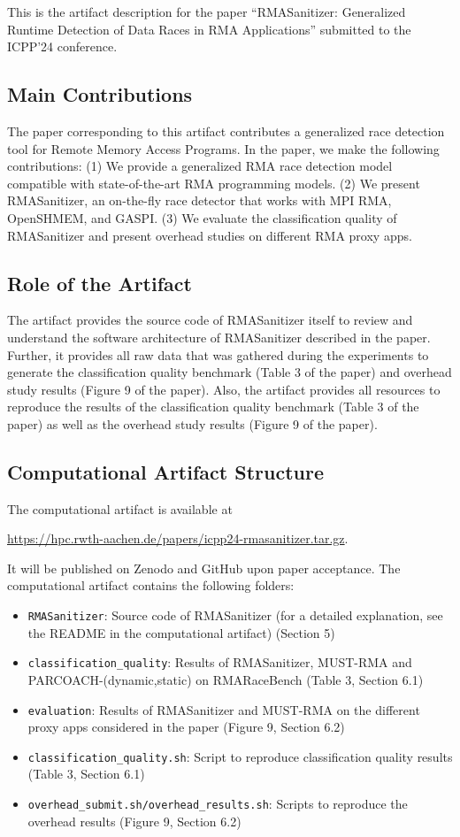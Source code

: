 \documentclass[twoside]{article}
\begin{document}
This is the artifact description for the paper ``RMASanitizer: Generalized Runtime Detection of Data Races in RMA Applications'' submitted to the ICPP'24 conference.

\subsection*{Main Contributions}
The paper corresponding to this artifact contributes a generalized race detection tool for Remote Memory Access Programs. In the paper, we make the following contributions: (1) We provide a generalized RMA race detection model compatible with state-of-the-art RMA programming models. (2) We present RMASanitizer, an on-the-fly race detector that works with MPI RMA, OpenSHMEM, and GASPI. (3) We evaluate the classification quality of RMASanitizer and present overhead studies on different RMA proxy apps.

\subsection*{Role of the Artifact}
The artifact provides the source code of RMASanitizer itself to review and understand the software architecture of RMASanitizer described in the paper. Further, it provides all raw data that was gathered during the experiments to generate the classification quality benchmark (Table 3 of the paper) and overhead study results (Figure 9 of the paper). Also, the artifact provides all resources to reproduce the results of the classification quality benchmark (Table 3 of the paper) as well as the overhead study results (Figure 9 of the paper).


\subsection*{Computational Artifact Structure}
The computational artifact is available at 
\begin{center}
\url{https://hpc.rwth-aachen.de/papers/icpp24-rmasanitizer.tar.gz}.
\end{center}

It will be published on Zenodo and GitHub upon paper acceptance.
The computational artifact contains the following folders:
\begin{itemize}
    \item \texttt{RMASanitizer}: Source code of RMASanitizer (for a detailed explanation, see the README in the computational artifact) (Section 5)
    \item \texttt{classification\_quality}: Results of RMASanitizer, MUST-RMA and PARCOACH-(dynamic,static) on RMARaceBench (Table 3, Section 6.1)
    \item \texttt{evaluation}: Results of RMASanitizer and MUST-RMA on the different proxy apps considered in the paper (Figure 9, Section 6.2)
    \item \texttt{classification\_quality.sh}: Script to reproduce classification quality results (Table 3, Section 6.1)
    \item \texttt{overhead\_submit.sh/overhead\_results.sh}: Scripts to reproduce the overhead results (Figure 9, Section 6.2)
\end{itemize}
\end{document}
